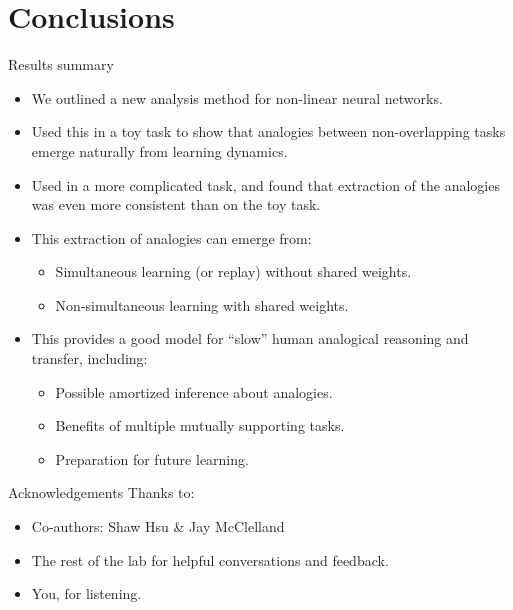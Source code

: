 \documentclass{beamer}
\begin{document}
\section{Conclusions}

\begin{frame}{Results summary}
\begin{itemize}
    \item<1-> We outlined a new analysis method for non-linear neural networks. 
    \item<2-> Used this in a toy task to show that analogies between non-overlapping tasks emerge naturally from learning dynamics. 
    \item<3-> Used in a more complicated task, and found that extraction of the analogies was even more consistent than on the toy task. 
    \item<4-> This extraction of analogies can emerge from:
    \begin{itemize}
	\item<5-> Simultaneous learning (or replay) without shared weights. 
	\item<6-> Non-simultaneous learning with shared weights.
    \end{itemize}
    \item<7-> This provides a good model for ``slow'' human analogical reasoning and transfer, including:
    \begin{itemize}
	\item<8-> Possible amortized inference about analogies.
	\item<9-> Benefits of multiple mutually supporting tasks.
	\item<10-> Preparation for future learning.
    \end{itemize}
\end{itemize}
\end{frame}

\begin{frame}{Acknowledgements}
Thanks to:
\begin{itemize}
    \item Co-authors: Shaw Hsu \& Jay McClelland
    \item The rest of the lab for helpful conversations and feedback. 
    \item You, for listening.
\end{itemize}
\end{frame}

\begin{frame}[allowframebreaks]


\end{frame}
\end{document}
